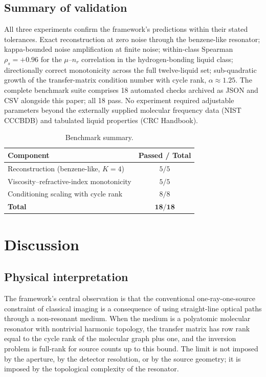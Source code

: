 \documentclass[11pt,twocolumn,a4paper]{article}
\theoremstyle{definition}
\theoremstyle{remark}
\begin{document}
\subsection{Summary of validation}

All three experiments confirm the framework's predictions within their stated tolerances. Exact reconstruction at zero noise through the benzene-like resonator; kappa-bounded noise amplification at finite noise; within-class Spearman $\rho_s = +0.96$ for the $\mu$--$n_r$ correlation in the hydrogen-bonding liquid class; directionally correct monotonicity across the full twelve-liquid set; sub-quadratic growth of the transfer-matrix condition number with cycle rank, $\alpha \approx 1.25$. The complete benchmark suite comprises 18 automated checks archived as JSON and CSV alongside this paper; all 18 pass. No experiment required adjustable parameters beyond the externally supplied molecular frequency data (NIST CCCBDB) and tabulated liquid properties (CRC Handbook).

\begin{table}[H]
\centering\small
\caption{Benchmark summary.}
\label{tab:bench_summary}
\begin{tabular}{lc}
\toprule
\textbf{Component} & \textbf{Passed / Total}\\
\midrule
Reconstruction (benzene-like, $K = 4$)   & $5 / 5$\\
Viscosity--refractive-index monotonicity & $5 / 5$\\
Conditioning scaling with cycle rank     & $8 / 8$\\
\midrule
\textbf{Total}                           & $\mathbf{18 / 18}$\\
\bottomrule
\end{tabular}
\end{table}

\section{Discussion}
\label{sec:discussion}

\subsection{Physical interpretation}

The framework's central observation is that the conventional one-ray-one-source constraint of classical imaging is a consequence of using straight-line optical paths through a non-resonant medium. When the medium is a polyatomic molecular resonator with nontrivial harmonic topology, the transfer matrix has row rank equal to the cycle rank of the molecular graph plus one, and the inversion problem is full-rank for source counts up to this bound. The limit is not imposed by the aperture, by the detector resolution, or by the source geometry; it is imposed by the topological complexity of the resonator.
\end{document}
